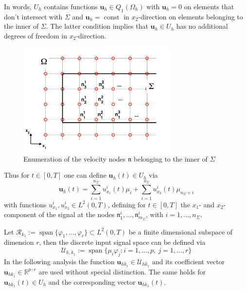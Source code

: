 \documentclass[a4paper,10pt,BCOR=15mm]{scrbook}
\DeclareMathOperator{\spann}{span}
\DeclareMathOperator{\const}{const}
\begin{document}
In words, $U_h$ contains functions $\mathbf u_h \in Q_1(\Omega_h)$ with $\mathbf u_h=0$ on elements that don't intersect with $\Sigma$ and $\mathbf u_h = \const $ in $x_2$-direction on elements belonging to the inner of $\Sigma$. The latter condition implies that $\mathbf u_h \in U_h$ has no additional degrees of freedom in $x_2$-direction. 

\begin{figure}[htbp]
\begin{center}
 \includegraphics[width=8cm]{pics/numex/numvelnod.pdf}
 \caption{Enumeration of the velocity nodes $\mathfrak n$ belonging to the inner of $\Sigma$}
 \label{numvelnod}
\end{center}
\end{figure}

Thus for $t\in [0,T]$ one can define $\mathbf u_h(t) \in U_h$ via
\begin{equation*}
 \mathbf u_h(t) = \sum _{i=1}^{n_\Sigma}u_{x_1}^i(t)\mu_i+ \sum _{i=1}^{n_\Sigma}u_{x_2}^i(t)\mu_{n_\Sigma+i}
\end{equation*}
with functions $u^i_{x_1},u^i_{x_2}\in L^2(0,T)$, defining for $t\in [0,T]$ the $x_1$- and $x_2$-component of the signal at the nodes $\mathfrak n_1^i, \dotsc, \mathfrak n_{m_\Sigma}^i$, with $i=1,\dotsc,n_\Sigma$.

Let $\mathcal R_{k_1} := \spann \bigl \{ \varphi_1, \dotsc ,\varphi_r \bigr \} \subset  L^2(0,T)$ be a finite dimensional subspace of dimension $r$, then the discrete input signal space can be defined via
\begin{equation*}
 \mathcal U_{h,k_1} := \spann \bigl \{ \mu_i\varphi_j: i=1,\dotsc,p, ~j=1, \dotsc ,r \bigr \}
\end{equation*}
In the following analysis the function $\mathbf u_{hk_1} \in \mathcal U_{hk_1} $ and its coefficient vector $\mathbf u_{hk_1} \in \mathbb R^{p\cdot r}$ are used without special distinction. The same holds for $\mathbf u_{hk_1}(t) \in U_h$ and the corresponding vector $\mathbf u_{hk_1}(t)$.
\end{document}

